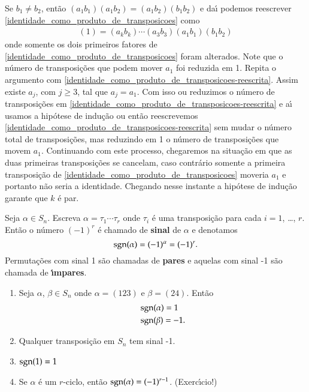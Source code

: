 \begin{prova}
	Se $b_1 \ne b_2$, ent\~ao $(a_1 b_1)(a_1 b_2) = (a_1 b_2)(b_1 b_2)$ e da{\'\i} podemos reescrever \eqref{identidade_como_produto_de_transposicoes} como
	\begin{align}\label{identidade_como_produto_de_transposicoes-reescrita}
		(1) = (a_k b_k)\cdots (a_3 b_3)(a_1 b_1)(b_1 b_2)
	\end{align}
	onde somente os dois primeiros fatores de \eqref{identidade_como_produto_de_transposicoes} foram alterados. Note que o n\'umero de transposi\c{c}\~oes que podem mover $a_1$ foi reduzida em 1. Repita o argumento com \eqref{identidade_como_produto_de_transposicoes-reescrita}. Assim existe $a_j$, com $j \ge 3$, tal que $a_j = a_1$. Com isso ou reduzimos o n\'umero de transposi\c{c}\~oes em \eqref{identidade_como_produto_de_transposicoes-reescrita} e a{\'\i} usamos a hip\'otese de indu\c{c}\~ao ou ent\~ao reescrevemos \eqref{identidade_como_produto_de_transposicoes-reescrita} sem mudar o n\'umero total de transposi\c{c}\~oes, mas reduzindo em 1 o n\'umero de transposi\c{c}\~oes que movem $a_1$. Continuando com este processo, chegaremos na situa\c{c}\~ao em que as duas primeiras transposi\c{c}\~oes se cancelam, caso contr\'ario somente a primeira transposi\c{c}\~ao de \eqref{identidade_como_produto_de_transposicoes} moveria $a_1$ e portanto n\~ao seria a identidade. Chegando nesse instante a hip\'otese de indu\c{c}\~ao garante que $k$ \'e par.
\end{prova}

\begin{definicao}
	Seja $\alpha \in S_n$. Escreva $\alpha = \tau_1 \cdots\tau_r$ onde $\tau_i$ \'e uma transposi\c{c}\~ao para cada $i = 1$, \dots, $r$. Ent\~ao o n\'umero $(-1)^r$ \'e chamado de \textbf{sinal} de $\alpha$ e denotamos
	\begin{equation}
		{\rm sgn}(\alpha) = (-1)^\alpha = (-1)^r.
	\end{equation}
	Permuta\c{c}\~oes com sinal 1 s\~ao chamadas de \textbf{pares} e aquelas com sinal -1 s\~ao chamada de \textbf{{\'\i}mpares}.
\end{definicao}

\begin{exemplos}
	\begin{enumerate}
		\item Seja $\alpha$, $\beta \in S_n$ onde $\alpha = (123)$ e $\beta = (24)$. Ent\~ao
		\begin{align*}
			&{\rm sgn}(\alpha) = 1\\
			&{\rm sgn}(\beta) = -1.
		\end{align*}

		\item Qualquer transposi\c{c}\~ao em $S_n$ tem sinal -1.

		\item ${\rm sgn}(1) = 1$

		\item Se $\alpha$ \'e um $r$-ciclo, ent\~ao ${\rm sgn}(\alpha) = (-1)^{r - 1}$. (Exerc{\'\i}cio!)
	\end{enumerate}
\end{exemplos}

